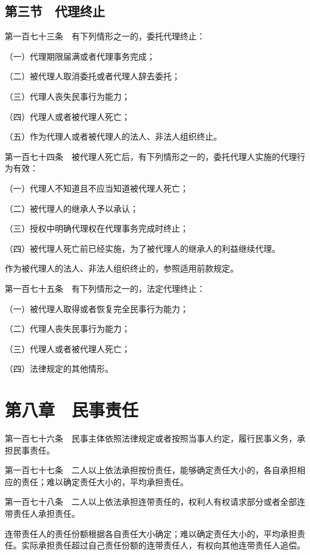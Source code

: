 \documentclass[UTF8,12pt,a4paper]{ctexbook}
\begin{document}
\subsection*{第三节　代理终止}

第一百七十三条　有下列情形之一的，委托代理终止：

（一）代理期限届满或者代理事务完成；

（二）被代理人取消委托或者代理人辞去委托；

（三）代理人丧失民事行为能力；

（四）代理人或者被代理人死亡；

（五）作为代理人或者被代理人的法人、非法人组织终止。

第一百七十四条　被代理人死亡后，有下列情形之一的，委托代理人实施的代理行为有效：

（一）代理人不知道且不应当知道被代理人死亡；

（二）被代理人的继承人予以承认；

（三）授权中明确代理权在代理事务完成时终止；

（四）被代理人死亡前已经实施，为了被代理人的继承人的利益继续代理。

作为被代理人的法人、非法人组织终止的，参照适用前款规定。

第一百七十五条　有下列情形之一的，法定代理终止：

（一）被代理人取得或者恢复完全民事行为能力；

（二）代理人丧失民事行为能力；

（三）代理人或者被代理人死亡；

（四）法律规定的其他情形。

\section*{第八章　民事责任}

第一百七十六条　民事主体依照法律规定或者按照当事人约定，履行民事义务，承担民事责任。

第一百七十七条　二人以上依法承担按份责任，能够确定责任大小的，各自承担相应的责任；难以确定责任大小的，平均承担责任。

第一百七十八条　二人以上依法承担连带责任的，权利人有权请求部分或者全部连带责任人承担责任。

连带责任人的责任份额根据各自责任大小确定；难以确定责任大小的，平均承担责任。实际承担责任超过自己责任份额的连带责任人，有权向其他连带责任人追偿。
\end{document}
